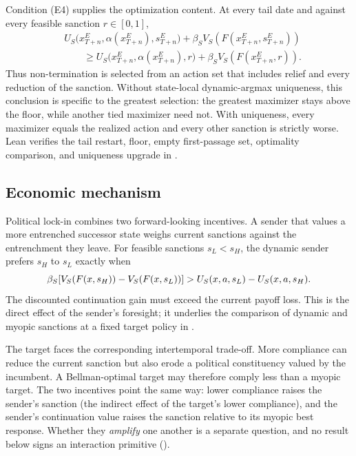Condition (E4) supplies the optimization content. At every tail date
and against every feasible sanction $r\in[0,1]$,
\[
\begin{split}
&U_S\bigl(x_{T+n}^E,\alpha(x_{T+n}^E),s_{T+n}^E\bigr)
 +\beta_S V_S\!\left(F(x_{T+n}^E,s_{T+n}^E)\right)\\
&\qquad\ge
 U_S\bigl(x_{T+n}^E,\alpha(x_{T+n}^E),r\bigr)
 +\beta_S V_S\!\left(F(x_{T+n}^E,r)\right).
\end{split}
\]
Thus non-termination is selected from an action set that includes
relief and every reduction of the sanction. Without state-local dynamic-argmax
uniqueness, this conclusion is specific to the greatest selection: the greatest
maximizer stays above the floor, while another tied maximizer need not.
With uniqueness, every maximizer equals the realized action and every
other sanction is strictly worse. Lean verifies the tail
restart, floor, empty first-passage set, optimality comparison, and
uniqueness upgrade in
.

\subsection{Economic mechanism}
\label{sec:mechanism}
\label{sec:mechanism:forces}

Political lock-in combines two forward-looking incentives. A sender
that values a more entrenched successor state weighs current sanctions
against the entrenchment they leave. For feasible sanctions $s_L<s_H$, the dynamic sender
prefers $s_H$ to $s_L$ exactly when
\[
\beta_S\!\left[
V_S(F(x,s_H))-V_S(F(x,s_L))
\right]
>
U_S(x,a,s_L)-U_S(x,a,s_H).
\]
The discounted continuation gain must exceed the current payoff loss.
This is the direct effect of the sender's foresight; it underlies the
comparison of dynamic and myopic sanctions at a fixed target policy in
.

The target faces the corresponding intertemporal trade-off. More
compliance can reduce the current sanction but also erode a political
constituency valued by the incumbent. A Bellman-optimal target may
therefore comply less than a myopic target. The two incentives point the same way:
lower compliance raises the sender's sanction (the indirect effect of the target's lower compliance), and the sender's
continuation value raises the sanction relative to its myopic best response.
Whether they \emph{amplify} one another is a separate question, and no result
below signs an interaction primitive ().

